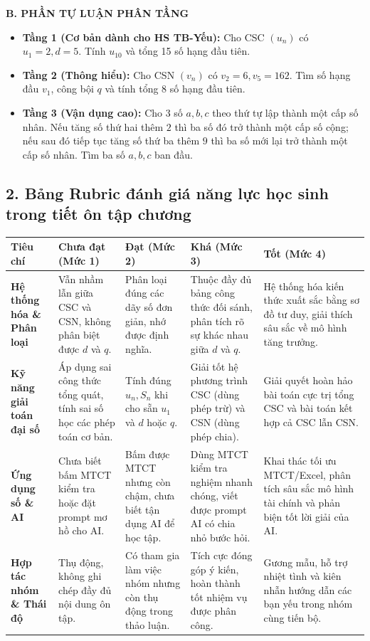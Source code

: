 \documentclass[12pt, a4paper]{article}
\begin{document}
\noindent \textbf{B. PHẦN TỰ LUẬN PHÂN TẦNG}
\begin{itemize}[leftmargin=0.6cm]
    \item \textbf{Tầng 1 (Cơ bản dành cho HS TB-Yếu):} Cho CSC $(u_n)$ có $u_1 = 2, d = 5$. Tính $u_{10}$ và tổng 15 số hạng đầu tiên.
    \item \textbf{Tầng 2 (Thông hiểu):} Cho CSN $(v_n)$ có $v_2 = 6, v_5 = 162$. Tìm số hạng đầu $v_1$, công bội $q$ và tính tổng 8 số hạng đầu tiên.
    \item \textbf{Tầng 3 (Vận dụng cao):} Cho 3 số $a, b, c$ theo thứ tự lập thành một cấp số nhân. Nếu tăng số thứ hai thêm $2$ thì ba số đó trở thành một cấp số cộng; nếu sau đó tiếp tục tăng số thứ ba thêm $9$ thì ba số mới lại trở thành một cấp số nhân. Tìm ba số $a, b, c$ ban đầu.
\end{itemize}

\subsection*{2. Bảng Rubric đánh giá năng lực học sinh trong tiết ôn tập chương}

\begin{center}
\small
\begin{tabularx}{\textwidth}{|p{2.8cm}|X|X|X|X|}
\hline
\textbf{Tiêu chí} & \textbf{Chưa đạt (Mức 1)} & \textbf{Đạt (Mức 2)} & \textbf{Khá (Mức 3)} & \textbf{Tốt (Mức 4)} \\ \hline
\textbf{Hệ thống hóa \& Phân loại} & Vẫn nhầm lẫn giữa CSC và CSN, không phân biệt được $d$ và $q$. & Phân loại đúng các dãy số đơn giản, nhớ được định nghĩa. & Thuộc đầy đủ bảng công thức đối sánh, phân tích rõ sự khác nhau giữa $d$ và $q$. & Hệ thống hóa kiến thức xuất sắc bằng sơ đồ tư duy, giải thích sâu sắc về mô hình tăng trưởng. \\ \hline
\textbf{Kỹ năng giải toán đại số} & Áp dụng sai công thức tổng quát, tính sai số học các phép toán cơ bản. & Tính đúng $u_n, S_n$ khi cho sẵn $u_1$ và $d$ hoặc $q$. & Giải tốt hệ phương trình CSC (dùng phép trừ) và CSN (dùng phép chia). & Giải quyết hoàn hảo bài toán cực trị tổng CSC và bài toán kết hợp cả CSC lẫn CSN. \\ \hline
\textbf{Ứng dụng số \& AI} & Chưa biết bấm MTCT kiểm tra hoặc đặt prompt mơ hồ cho AI. & Bấm được MTCT nhưng còn chậm, chưa biết tận dụng AI để học tập. & Dùng MTCT kiểm tra nghiệm nhanh chóng, viết được prompt AI có chia nhỏ bước hỏi. & Khai thác tối ưu MTCT/Excel, phân tích sâu sắc mô hình tài chính và phản biện tốt lời giải của AI. \\ \hline
\textbf{Hợp tác nhóm \& Thái độ} & Thụ động, không ghi chép đầy đủ nội dung ôn tập. & Có tham gia làm việc nhóm nhưng còn thụ động trong thảo luận. & Tích cực đóng góp ý kiến, hoàn thành tốt nhiệm vụ được phân công. & Gương mẫu, hỗ trợ nhiệt tình và kiên nhẫn hướng dẫn các bạn yếu trong nhóm cùng tiến bộ. \\ \hline
\end{tabularx}
\end{center}
\end{document}
